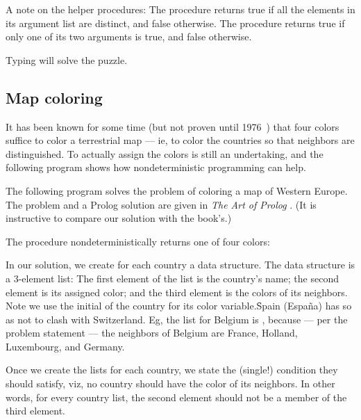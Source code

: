 \n A note on the helper procedures: The procedure
 returns true if all the elements in its
argument list are distinct, and false otherwise.  The
procedure  returns true if only one of its two
arguments is true, and false otherwise.

Typing  will solve the puzzle.

\subsection{Map coloring}

It has been known for some time (but not proven until
1976~\cite{4cp}) that four colors suffice to
color a terrestrial map --- ie, to color the countries
so that neighbors are distinguished.  To actually
assign the colors is still an undertaking, and the
following program shows how nondeterministic
programming can help.

The following program solves the problem of coloring a
map of Western Europe.  The problem and a Prolog
solution are given in {\em The Art of
Prolog} \cite{aop}.  (It is instructive to compare
our solution with the book's.)

%

The procedure  nondeterministically
returns one of four colors:


\n In our solution, we create for each country a data
structure.  The data structure is a 3-element list: The
first element of the list is the country's name; the
second element is its assigned color; and the third
element is the colors of its neighbors.  Note we use
the initial of the country for its color
variable.\f{Spain (Espa\~na) has  so as not to
clash with Switzerland.}  Eg, the list for Belgium is
, because --- per
the problem statement --- the neighbors of Belgium are
France, Holland, Luxembourg, and Germany.

Once we create the lists for each country, we state the
(single!) condition they should satisfy, viz, no
country should have the color of its neighbors.  In
other words, for every country list, the second element
should not be a member of the third element.

